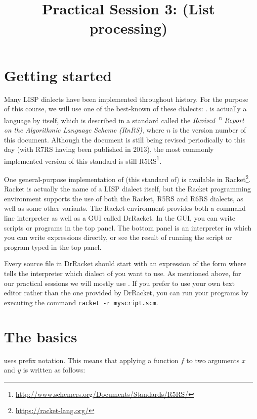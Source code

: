 \documentclass{../../../tp}
\title{Practical Session 3: \scheme (List processing)}
\author{}
\begin{document}
\maketitle

\section{Getting started}

Many LISP dialects have been implemented throughout history. For the purpose of this course, we will use one of the best-known of these dialects: \scheme. \scheme is actually a language by itself, which is described in a standard called the \emph{Revised\ \textsuperscript{n} Report on the Algorithmic Language Scheme (RnRS)}, where $n$ is the version number of this document. Although the document is still being revised periodically to this day (with R7RS having been published in 2013), the most commonly implemented version of this standard is still R5RS\footnote{\url{http://www.schemers.org/Documents/Standards/R5RS/}}. 

One general-purpose implementation of (this standard of) \scheme is available in Racket\footnote{\url{https://racket-lang.org/}}. Racket is actually the name of a LISP dialect itself, but the Racket programming environment supports the use of both the Racket, R5RS and R6RS \scheme dialects, as well as some other variants. The Racket environment provides both a command-line interpreter as well as a GUI called DrRacket. In the GUI, you can write \scheme scripts or programs in the top panel. The bottom panel is an interpreter in which you can write expressions directly, or see the result of running the script or program typed in the top panel.

Every source file in DrRacket should start with an expression of the form  where  tells the interpreter which dialect of \scheme you want to use. As mentioned above, for our practical sessions we will mostly use . If you prefer to use your own text editor rather than the one provided by DrRacket, you can run your \scheme programs by executing the command \verb|racket -r myscript.scm|.

\section{The basics}

\scheme uses prefix notation. This means that applying a function $f$ to two arguments $x$ and $y$ is written as follows:
\end{document}
